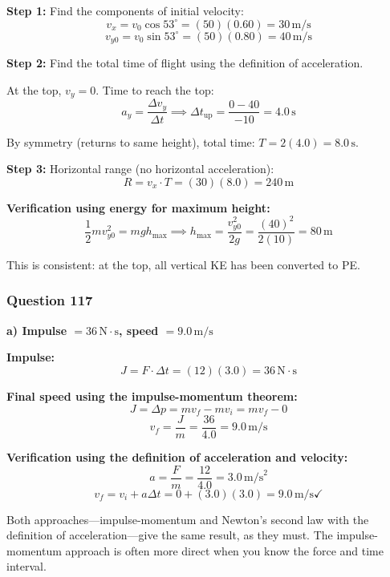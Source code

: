 \documentclass[12pt,letterpaper]{article}
\begin{document}
\begin{explanationbox}
\textbf{Step 1:} Find the components of initial velocity:
\[
v_{x} = v_0 \cos 53^\circ = (50)(0.60) = 30\,\text{m/s}
\]
\[
v_{y0} = v_0 \sin 53^\circ = (50)(0.80) = 40\,\text{m/s}
\]

\textbf{Step 2:} Find the total time of flight using the definition of acceleration.

At the top, $v_y = 0$. Time to reach the top:
\[
a_y = \frac{\Delta v_y}{\Delta t} \implies \Delta t_{\text{up}} = \frac{0 - 40}{-10} = 4.0\,\text{s}
\]

By symmetry (returns to same height), total time: $T = 2(4.0) = 8.0\,\text{s}$.

\textbf{Step 3:} Horizontal range (no horizontal acceleration):
\[
R = v_x \cdot T = (30)(8.0) = 240\,\text{m}
\]

\textbf{Verification using energy for maximum height:}
\[
\frac{1}{2}mv_{y0}^2 = mgh_{\text{max}} \implies h_{\text{max}} = \frac{v_{y0}^2}{2g} = \frac{(40)^2}{2(10)} = 80\,\text{m}
\]

This is consistent: at the top, all vertical KE has been converted to PE.
\end{explanationbox}

\subsubsection*{Question 117}

\begin{answerbox}
\textbf{a) Impulse $= 36\,\text{N}\cdot\text{s}$, speed $= 9.0\,\text{m/s}$}
\end{answerbox}

\begin{explanationbox}
\textbf{Impulse:}
\[
J = F \cdot \Delta t = (12)(3.0) = 36\,\text{N}\cdot\text{s}
\]

\textbf{Final speed using the impulse-momentum theorem:}
\[
J = \Delta p = mv_f - mv_i = mv_f - 0
\]
\[
v_f = \frac{J}{m} = \frac{36}{4.0} = 9.0\,\text{m/s}
\]

\textbf{Verification using the definition of acceleration and velocity:}
\[
a = \frac{F}{m} = \frac{12}{4.0} = 3.0\,\text{m/s}^2
\]
\[
v_f = v_i + a\Delta t = 0 + (3.0)(3.0) = 9.0\,\text{m/s} \checkmark
\]

Both approaches---impulse-momentum and Newton's second law with the definition of acceleration---give the same result, as they must. The impulse-momentum approach is often more direct when you know the force and time interval.
\end{explanationbox}
\end{document}
